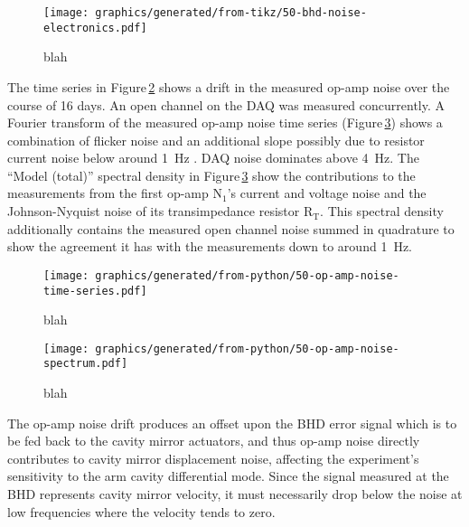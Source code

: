\begin{figure}
  \centering
  \texttt{[image: graphics/generated/from-tikz/50-bhd-noise-electronics.pdf]}
  \caption{\label{fig:bhd-noise-electronics}blah}
\end{figure}

The time series in Figure\,\ref{fig:op-amp-noise-time-series} shows a drift in the measured op-amp noise over the course of \SI{16}{} days. An open channel on the DAQ was measured concurrently. A Fourier transform of the measured op-amp noise time series (Figure\,\ref{fig:op-amp-noise-spectrum}) shows a combination of flicker noise and an additional slope possibly due to resistor current noise below around \SI{1}{\hertz} \cite{Seifert2009}. DAQ noise dominates above \SI{4}{\hertz}. The ``Model (total)'' spectral density in Figure\,\ref{fig:op-amp-noise-spectrum} show the contributions to the measurements from the first op-amp $\textrm{N}_{1}$'s current and voltage noise and the Johnson-Nyquist noise of its transimpedance resistor $\textrm{R}_{\textrm{T}}$. This spectral density additionally contains the measured open channel noise summed in quadrature to show the agreement it has with the measurements down to around \SI{1}{\hertz}.

\begin{figure}
  \centering
  \texttt{[image: graphics/generated/from-python/50-op-amp-noise-time-series.pdf]}
  \caption{\label{fig:op-amp-noise-time-series}blah}
\end{figure}

\begin{figure}
  \centering
  \texttt{[image: graphics/generated/from-python/50-op-amp-noise-spectrum.pdf]}
  \caption{\label{fig:op-amp-noise-spectrum}blah}
\end{figure}

The op-amp noise drift produces an offset upon the \gls{BHD} error signal which is to be fed back to the cavity mirror actuators, and thus op-amp noise directly contributes to cavity mirror displacement noise, affecting the experiment's sensitivity to the arm cavity differential mode. Since the signal measured at the \gls{BHD} represents cavity mirror velocity, it must necessarily drop below the noise at low frequencies where the velocity tends to zero.

